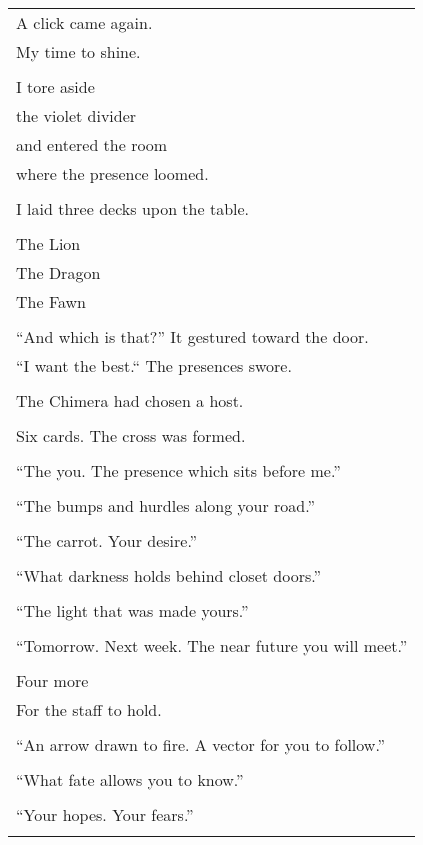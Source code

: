\documentclass{article}
\begin{document}
\begin{center}
\begin{tabular}{l}
\\
A click came again. \\
My time to shine. \\
\\
I tore aside \\
the violet divider \\
and entered the room \\
where the presence loomed. \\
\\
I laid three decks upon the table. \\
\\
The Lion \\
The Dragon \\
The Fawn \\
\\
``And which is that?'' It gestured toward the door. \\
``I want the best.`` The presences swore. \\
\\
The Chimera had chosen a host. \\
\\
Six cards.
The cross was formed. \\
\\
``The you.  The presence which sits before me.'' \\
\\
``The bumps and hurdles along your road.'' \\
\\
``The carrot.  Your desire.'' \\
\\
``What darkness holds behind closet doors.'' \\
\\
``The light that was made yours.'' \\
\\
``Tomorrow.  Next week.  The near future you will meet.'' \\
\\
Four more \\
For the staff to hold. \\
\\
``An arrow drawn to fire.  A vector for you to follow.'' \\
\\
``What fate allows you to know.'' \\
\\
``Your hopes.  Your fears.'' \\
\\

\end{tabular}
\end{center}
\end{document}
